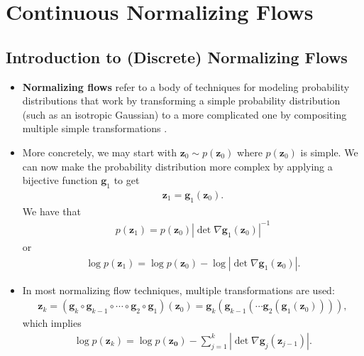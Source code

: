 \documentclass[10pt]{article}
\newcommand{\ve}[1]{\mathbf{#1}}
\begin{document}
\section{Continuous Normalizing Flows}

\subsection{Introduction to (Discrete) Normalizing Flows}

\begin{itemize}
  \item {\bf Normalizing flows} refer to a body of techniques for modeling probability distributions that work by transforming a simple probability distribution (such as an isotropic Gaussian) to a more complicated one by compositing multiple simple transformations \cite{Kobyzev:2021}.
  
  \item More concretely, we may start with $\ve{z}_0 \sim p(\ve{z}_0)$ where $p(\ve{z}_0)$ is simple. We can now make the probability distribution more complex by applying a bijective function $\ve{g}_1$ to get
  \begin{align*}
    \ve{z}_1 = \ve{g}_1(\ve{z}_0).
  \end{align*}
  We have that
  \begin{align*}
    p(\ve{z}_1) = p(\ve{z}_0) |\det \nabla \ve{g}_1(\ve{z}_0) |^{-1}
  \end{align*}
  or
  \begin{align*}
    \log p(\ve{z}_1) = \log p(\ve{z}_0) - \log | \det \nabla \ve{g}_1(\ve{z}_0) |.
  \end{align*}

  \item In most normalizing flow techniques, multiple transformations are used:
  \begin{align*}
    \ve{z}_k = (\ve{g}_k \circ \ve{g}_{k-1} \circ \dotsb \circ \ve{g}_2 \circ \ve{g}_1)(\ve{z}_0)
    = \ve{g}_k(\ve{g}_{k-1}(\dotsm\ve{g}_2(\ve{g}_1(\ve{z}_0)))),
  \end{align*}
  which implies
  \begin{align} \label{eqn:normalizing-flow-log-p}
    \log p(\ve{z}_k) = \log p(\ve{z_0}) - \sum_{j=1}^k |\det \nabla \ve{g}_j(\ve{z}_{j-1}) |.
  \end{align}  
  

\end{itemize}
\end{document}
